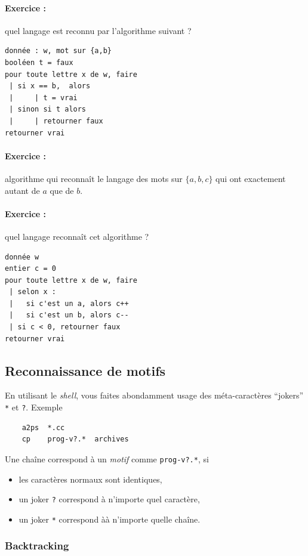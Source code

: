 \documentclass[10pt,twoside]{article}
\begin{document}
\paragraph{Exercice : } quel langage est reconnu par l'algorithme suivant ?
\begin{verbatim}
donnée : w, mot sur {a,b}
booléen t = faux
pour toute lettre x de w, faire 
 | si x == b,  alors 
 |     | t = vrai
 | sinon si t alors
 |     | retourner faux
retourner vrai
\end{verbatim}
 
\paragraph{Exercice :} algorithme qui reconnaît le langage des mots sur 
$\{a, b, c\}$ qui ont exactement autant de $a$ que de $b$.

\paragraph{Exercice :} quel langage reconnaît cet algorithme ?
\begin{verbatim}
donnée w
entier c = 0
pour toute lettre x de w, faire 
 | selon x :
 |   si c'est un a, alors c++
 |   si c'est un b, alors c--
 | si c < 0, retourner faux
retourner vrai
\end{verbatim}

\subsection{Reconnaissance de motifs}

En utilisant le \emph{shell}, vous faites abondamment usage des
méta-caractères ``jokers'' \texttt{*} et \texttt{?}. Exemple
\begin{verbatim}
    a2ps  *.cc
    cp    prog-v?.*  archives
\end{verbatim}

Une chaîne correspond à un \emph{motif} comme \texttt{prog-v?.*},
si
\begin{itemize}
\item les caractères normaux sont identiques,
\item un joker \texttt{?} correspond à n'importe quel caractère,
\item un joker \texttt{*} correspond àà n'importe quelle chaîne.
\end{itemize}

\subsubsection{Backtracking}
\end{document}
